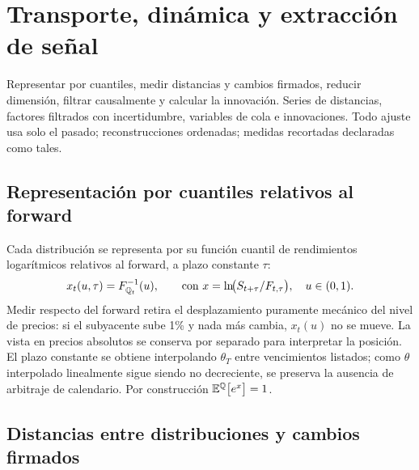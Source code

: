 \clearpage
\section{Transporte, dinámica y extracción de señal}\label{sec:transporte}

{Representar por cuantiles, medir distancias y cambios firmados, reducir dimensión, filtrar causalmente
y calcular la innovación.}
{Series de distancias, factores filtrados con incertidumbre, variables de cola e innovaciones.}
{Todo ajuste usa solo el pasado; reconstrucciones ordenadas; medidas recortadas declaradas como tales.}

\subsection{Representación por cuantiles relativos al forward}\label{sec:cuantiles}

Cada distribución se representa por su función cuantil de rendimientos logarítmicos relativos al
forward, a plazo constante $\tau$:
\begin{equation}
x_t(u,\tau)=F^{-1}_{\mathbb{Q}_t}(u),\qquad \text{con } x=\ln\!\bigl(S_{t+\tau}/F_{t,\tau}\bigr),\quad u\in(0,1).
\label{eq:cuantil}
\end{equation}
Medir respecto del forward retira el desplazamiento puramente mecánico del nivel de precios: si el
subyacente sube 1\% y nada más cambia, $x_t(u)$ no se mueve. La vista en precios absolutos se conserva
por separado para interpretar la posición. El plazo constante se obtiene interpolando $\theta_T$ entre
vencimientos listados; como $\theta$ interpolado linealmente sigue siendo no decreciente, se preserva la
ausencia de arbitraje de calendario. Por construcción $\mathbb{E}^{\mathbb{Q}}\bigl[e^{x}\bigr]=1$.

\subsection{Distancias entre distribuciones y cambios firmados}\label{sec:distancias}

